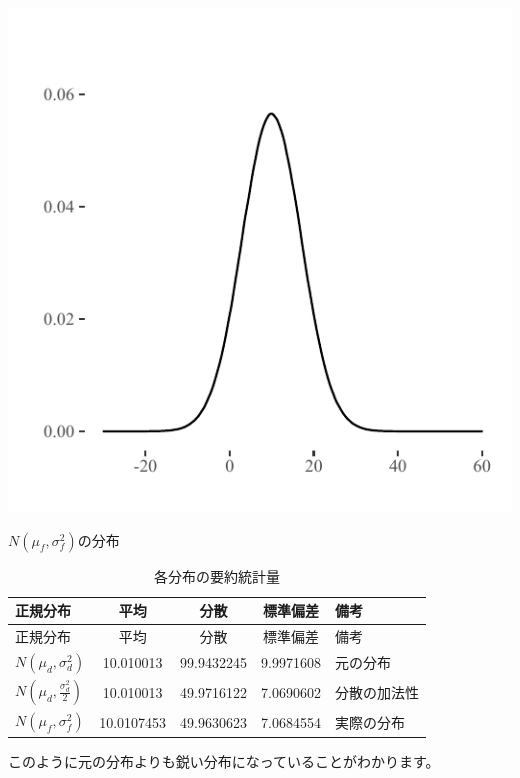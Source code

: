 \documentclass[]{tufte-handout}
\begin{document}
\begin{marginfigure}

{\centering \includegraphics{AdditivityOfVariance_files/figure-latex/unnamed-chunk-12-1} 

}

\caption[$N(\mu_f, \sigma^2_f)$の分布]{$N(\mu_f, \sigma^2_f)$の分布}\label{fig:unnamed-chunk-12}
\end{marginfigure}

\begin{longtable}[]{@{}lcccl@{}}
\caption{各分布の要約統計量}\tabularnewline
\toprule
正規分布 & 平均 & 分散 & 標準偏差 & 備考 \\
\midrule
\endfirsthead
\toprule
正規分布 & 平均 & 分散 & 標準偏差 & 備考 \\
\midrule
\endhead
\(N(\mu_d, \sigma^2_d)\) & 10.010013 & 99.9432245 & 9.9971608 &
元の分布 \\
\(N(\mu_d, \frac{\sigma^2_d}{2})\) & 10.010013 & 49.9716122 & 7.0690602
& 分散の加法性 \\
\(N(\mu_f, \sigma^2_f)\) & 10.0107453 & 49.9630623 & 7.0684554 &
実際の分布 \\
\bottomrule
\end{longtable}

このように元の分布よりも鋭い分布になっていることがわかります。
\end{document}
